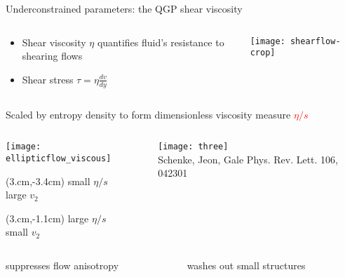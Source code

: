 \documentclass[svgnames]{beamer}
\begin{document}
\begin{frame}{Underconstrained parameters: the QGP shear viscosity}

\begin{columns}
 \begin{column}{0.55\textwidth}
  \begin{itemize}
    \item Shear viscosity $\eta$ quantifies fluid's resistance to shearing flows
    \vspace{0.05 in}
    \item Shear stress $\tau = \eta \frac{dv}{dy}$
  \end{itemize}
 \end{column}
 \begin{column}{0.35\textwidth}
  \vspace{0.1 in} \texttt{[image: shearflow-crop]}
 \end{column}
 \begin{column}{0.1\textwidth}
 \end{column}
\end{columns}
\vspace{0.2 in}
\centering Scaled by entropy density to form dimensionless viscosity measure \textcolor{red}{$\eta/s$}
\vspace{0.1 in}
\begin{columns}
 \begin{column}{0.5\textwidth}
  \texttt{[image: ellipticflow\_viscous]}
    \begin{textblock*}{\linewidth}(3.cm,-3.4cm)
      \footnotesize
      small $\eta/s$ \\
      large $v_2$
    \end{textblock*}
    \begin{textblock*}{\linewidth}(3.cm,-1.1cm)
      \footnotesize
      large $\eta/s$ \\
      small $v_2$
    \end{textblock*}
 \end{column}
 
 \begin{column}{0.5\textwidth}
  \centering \vspace{0.15 in}
  \texttt{[image: three]} \\
  \tiny Schenke, Jeon, Gale Phys. Rev. Lett. 106, 042301
 \end{column}
\end{columns}
\vspace{0.1 in}
\begin{columns}
 \begin{column}{0.5\textwidth}
  \centering suppresses flow anisotropy
 \end{column}
 \begin{column}{0.5\textwidth}
  \centering washes out small structures
 \end{column}

\end{columns}
 
\end{frame}
\end{document}
